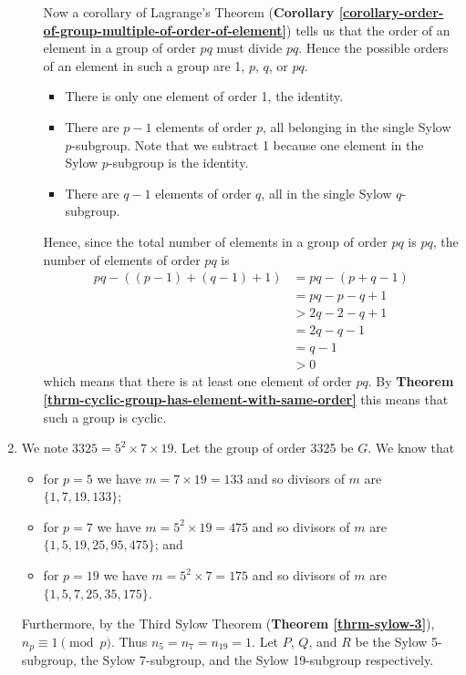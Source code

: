 \begin{enumerate}
\begin{enumerate}[label=(\roman*)]
        Now a corollary of Lagrange's Theorem (\textbf{Corollary \ref{corollary-order-of-group-multiple-of-order-of-element}}) tells us that the order of an element in a group of order $pq$ must divide $pq$. Hence the possible orders of an element in such a group are 1, $p$, $q$, or $pq$.
        \begin{itemize}
            \item There is only one element of order 1, the identity.
            \item There are $p - 1$ elements of order $p$, all belonging in the single Sylow $p$-subgroup. Note that we subtract 1 because one element in the Sylow $p$-subgroup is the identity.
            \item There are $q - 1$ elements of order $q$, all in the single Sylow $q$-subgroup.
        \end{itemize}
        Hence, since the total number of elements in a group of order $pq$ is $pq$, the number of elements of order $pq$ is
        \begin{align*}
            pq - \left((p-1)+(q-1)+1\right) &= pq - (p+q - 1)\\
            &= pq - p - q + 1\\
            &> 2q - 2 - q + 1\\
            &= 2q - q - 1\\
            &= q - 1\\
            &> 0
        \end{align*}
        which means that there is at least one element of order $pq$. By \textbf{Theorem \ref{thrm-cyclic-group-has-element-with-same-order}} this means that such a group is cyclic.
    \end{enumerate}
    
    \item We note $3325 = 5^2 \times 7 \times 19$. Let the group of order 3325 be $G$. We know that
    \begin{itemize}
        \item for $p = 5$ we have $m = 7 \times 19 = 133$ and so divisors of $m$ are $\{1, 7, 19, 133\}$;
        \item for $p = 7$ we have $m = 5^2 \times 19 = 475$ and so divisors of $m$ are $\{1, 5, 19, 25, 95, 475\}$; and
        \item for $p = 19$ we have $m = 5^2 \times 7 = 175$ and so divisors of $m$ are $\{1, 5, 7, 25, 35, 175\}$.
    \end{itemize}
    Furthermore, by the Third Sylow Theorem (\textbf{Theorem \ref{thrm-sylow-3}}), $n_p \equiv 1 \pmod p$. Thus $n_5 = n_7 = n_{19} = 1$. Let $P$, $Q$, and $R$ be the Sylow 5-subgroup, the Sylow 7-subgroup, and the Sylow 19-subgroup respectively.


\end{enumerate}
